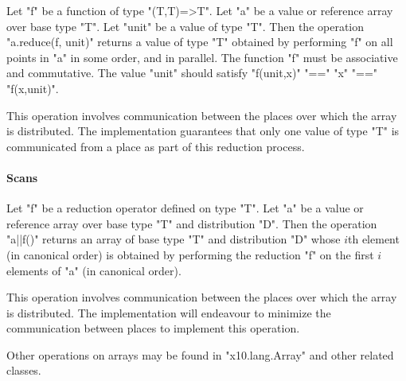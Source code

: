Let \xcd"f" be a function of type \xcd"(T,T)=>T".  Let
\xcd"a" be a value or reference array over base type \xcd"T".
Let \xcd"unit" be a value of type \xcd"T".
Then the
operation \xcd"a.reduce(f, unit)" returns a value of type \xcd"T" obtained
by performing \xcd"f" on all points in \xcd"a" in some order, and in
parallel.  The function \xcd"f" must be associative and
commutative.  The value \xcd"unit" should satisfy
\xcd"f(unit,x)" \xcd"==" \xcd"x" \xcd"==" \xcd"f(x,unit)".

This operation involves communication between the places over which
the array is distributed. The \Xten{} implementation guarantees that
only one value of type \xcd"T" is communicated from a place as part of
this reduction process.

\paragraph{Scans}\label{ArrayScans}

Let \xcd"f" be a reduction operator defined on type \xcd"T". Let
\xcd"a" be a value or reference array over base type \xcd"T" and
distribution \xcd"D". Then the operation \xcd"a||f()" returns an array
of base type \xcd"T" and distribution \xcd"D" whose $i$th element
(in canonical order) is obtained by performing the reduction \xcd"f"
on the first $i$ elements of \xcd"a" (in canonical order).

This operation involves communication between the places over which
the array is distributed. The \Xten{} implementation will endeavour to
minimize the communication between places to implement this operation.

Other operations on arrays may be found in \xcd"x10.lang.Array" and
other related classes.
